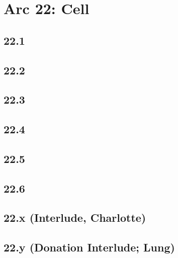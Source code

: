 \part*{Arc 22: Cell}
 \chapter*{22.1}
 \chapter*{22.2}
 \chapter*{22.3}
 \chapter*{22.4}
 \chapter*{22.5}
 \chapter*{22.6}
 \chapter*{22.x (Interlude, Charlotte)}
 \chapter*{22.y (Donation Interlude; Lung)}









